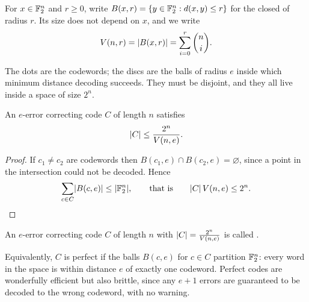 \documentclass[a4paper]{scrartcl}
\begin{document}
\begin{definition}
	For $x \in \mathbb{F}_2^n$ and $r \ge 0$, write $B(x,r) = \{y \in \mathbb{F}_2^n : d(x,y) \le r\}$ for the closed  of radius $r$. Its size does not depend on $x$, and we write
	$$V(n,r) = \lvert B(x,r)\rvert = \sum_{i=0}^{r}\binom{n}{i}.$$
\end{definition}

\begin{center}
\end{center}

The dots are the codewords; the discs are the balls of radius $e$ inside which minimum distance decoding succeeds. They must be disjoint, and they all live inside a space of size $2^n$.

\begin{lemma}\label{lem:hamming}
	An $e$-error correcting code $C$ of length $n$ satisfies
	$$\lvert C\rvert \le \frac{2^n}{V(n,e)}.$$
\end{lemma}

\begin{proof}
	If $c_1 \ne c_2$ are codewords then $B(c_1,e) \cap B(c_2,e) = \varnothing$, since a point in the intersection could not be decoded. Hence
	$$\sum_{c \in C} \lvert B(c,e)\rvert \le \lvert\mathbb{F}_2^n\rvert, \qquad \text{that is} \qquad \lvert C\rvert\,V(n,e) \le 2^n. \qedhere$$
\end{proof}

\begin{definition}
	An $e$-error correcting code $C$ of length $n$ with $\lvert C\rvert = \frac{2^n}{V(n,e)}$ is called .
\end{definition}

\begin{remark}
	Equivalently, $C$ is perfect if the balls $B(c,e)$ for $c \in C$ partition $\mathbb{F}_2^n$: every word in the space is within distance $e$ of exactly one codeword. Perfect codes are wonderfully efficient but also brittle, since any $e+1$ errors are guaranteed to be decoded to the wrong codeword, with no warning.
\end{remark}
\end{document}
